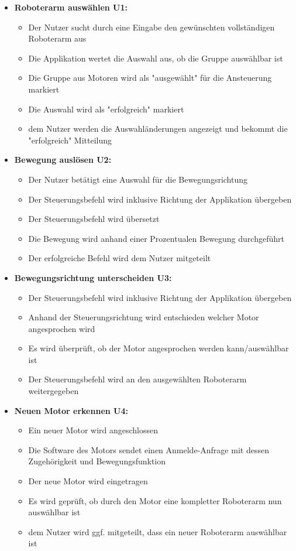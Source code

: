 \begin{itemize}
	\item \textbf{Roboterarm auswählen U1:}\\
	\begin{itemize}
		\item Der Nutzer sucht durch eine Eingabe den gewünschten vollständigen Roboterarm aus
		\item Die Applikation wertet die Auswahl aus, ob die Gruppe auswählbar ist
		\item Die Gruppe aus Motoren wird als "ausgewählt" für die Ansteuerung markiert
		\item Die Auswahl wird als "erfolgreich" markiert
		\item dem Nutzer werden die Auswahländerungen angezeigt und bekommt die "erfolgreich" Mitteilung
	\end{itemize}
	
	\item \textbf{Bewegung auslösen U2:}\\
	\begin{itemize}
		\item Der Nutzer betätigt eine Auswahl für die Bewegungsrichtung
		\item Der Steuerungsbefehl wird inklusive Richtung der Applikation übergeben
		\item Der Steuerungsbefehl wird übersetzt
		\item Die Bewegung wird anhand einer Prozentualen Bewegung durchgeführt
		\item Der erfolgreiche Befehl wird dem Nutzer mitgeteilt
	\end{itemize}
	
	\item \textbf{Bewegungsrichtung unterscheiden U3:}\\
	\begin{itemize}
		\item Der Steuerungsbefehl wird inklusive Richtung der Applikation übergeben
		\item Anhand der Steuerungsrichtung wird entschieden welcher Motor angesprochen wird
		\item Es wird überprüft, ob der Motor angesprochen werden kann/auswählbar ist
		\item Der Steuerungsbefehl wird an den ausgewählten Roboterarm weitergegeben
	\end{itemize}
	
	\item \textbf{Neuen Motor erkennen U4:}\\
	\begin{itemize}
		\item Ein neuer Motor wird angeschlossen
		\item Die Software des Motors sendet einen Anmelde-Anfrage mit dessen Zugehörigkeit und Bewegungsfunktion
		\item Der neue Motor wird eingetragen
		\item Es wird geprüft, ob durch den Motor eine kompletter Roboterarm nun auswählbar ist
		\item dem Nutzer wird ggf. mitgeteilt, dass ein neuer Roboterarm auswählbar ist
	\end{itemize}
	

\end{itemize}
